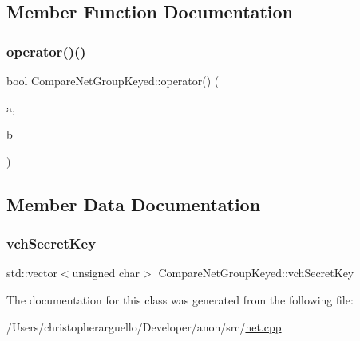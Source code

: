 \subsection{Member Function Documentation}
\mbox{\label{class_compare_net_group_keyed_ae9569566c7a6db87cc38a58476cbfc40}} 
\subsubsection{\texorpdfstring{operator()()}{operator()()}}
{\footnotesize\ttfamily bool Compare\+Net\+Group\+Keyed\+::operator() (\begin{DoxyParamCaption}\item[{const \mbox{\hyperlink{class_c_node_ref}{C\+Node\+Ref}} \&}]{a,  }\item[{const \mbox{\hyperlink{class_c_node_ref}{C\+Node\+Ref}} \&}]{b }\end{DoxyParamCaption})\hspace{0.3cm}{\ttfamily [inline]}}



\subsection{Member Data Documentation}
\mbox{\label{class_compare_net_group_keyed_ad20bf41a9eeec19a8357dc640fd70199}} 
\subsubsection{\texorpdfstring{vch\+Secret\+Key}{vchSecretKey}}
{\footnotesize\ttfamily std\+::vector$<$unsigned char$>$ Compare\+Net\+Group\+Keyed\+::vch\+Secret\+Key\hspace{0.3cm}{\ttfamily [private]}}



The documentation for this class was generated from the following file\+:\begin{DoxyCompactItemize}
\item 
/\+Users/christopherarguello/\+Developer/anon/src/\mbox{\hyperlink{net_8cpp}{net.\+cpp}}\end{DoxyCompactItemize}
